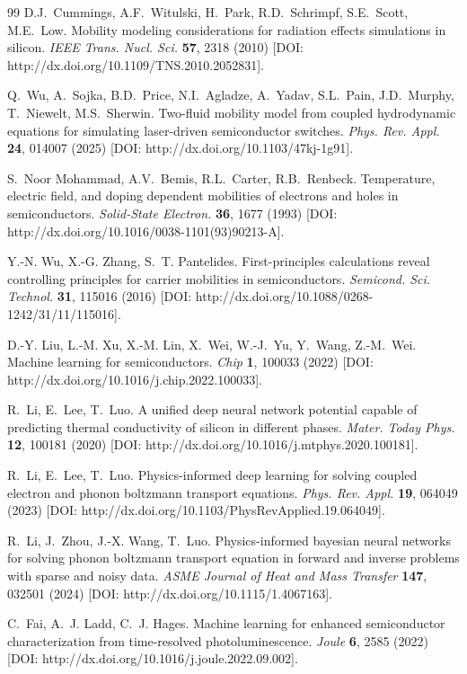 \documentclass[fleqn,twoside,twocolumn,nofootinbib,showkeys]{revtex4} %
\begin{document}
\begin{thebibliography}{99}
D.J.~Cummings, A.F.~Witulski, H.~Park, R.D.~Schrimpf, S.E.~Scott, M.E.~Low. Mobility modeling considerations for radiation effects simulations in silicon. \textit{IEEE Trans. Nucl. Sci.} \textbf{57}, 2318 (2010) [DOI: http://dx.doi.org/10.1109/TNS.2010.2052831].


Q.~Wu, A.~Sojka, B.D.~Price, N.I.~Agladze, A.~Yadav, S.L.~Pain, J.D.~Murphy, T.~Niewelt, M.S.~Sherwin. Two-fluid mobility model from coupled hydrodynamic equations for simulating laser-driven semiconductor switches. \textit{Phys. Rev. Appl.} \textbf{24}, 014007 (2025) [DOI: http://dx.doi.org/10.1103/47kj-1g91].


S.~Noor Mohammad, A.V.~Bemis, R.L.~Carter, R.B.~Renbeck. Temperature, electric field, and doping dependent mobilities of electrons and holes in semiconductors. \textit{Solid-State Electron.} \textbf{36}, 1677 (1993) [DOI: http://dx.doi.org/10.1016/0038-1101(93)90213-A].


Y.-N. Wu, X.-G. Zhang, S.~T. Pantelides. First-principles calculations reveal controlling principles for carrier mobilities in semiconductors. \textit{Semicond. Sci. Technol.} \textbf{31}, 115016 (2016) [DOI: http://dx.doi.org/10.1088/0268-1242/31/11/115016].

D.-Y. Liu, L.-M. Xu, X.-M. Lin, X.~Wei, W.-J.~Yu, Y.~Wang, Z.-M.~Wei. Machine learning for semiconductors. \textit{Chip} \textbf{1}, 100033 (2022) [DOI: http://dx.doi.org/10.1016/j.chip.2022.100033].


R.~Li, E.~Lee, T.~Luo. A unified deep neural network potential capable of predicting thermal conductivity of silicon in different phases. \textit{Mater. Today Phys.} \textbf{12}, 100181 (2020) [DOI: http://dx.doi.org/10.1016/j.mtphys.2020.100181].

R.~Li, E.~Lee, T.~Luo. Physics-informed deep learning for solving coupled electron and phonon boltzmann transport equations. \textit{Phys. Rev. Appl.} \textbf{19}, 064049 (2023) [DOI: http://dx.doi.org/10.1103/PhysRevApplied.19.064049].

R.~Li, J.~Zhou, J.-X. Wang, T.~Luo. Physics-informed bayesian neural networks for solving phonon boltzmann transport equation in forward and inverse problems with sparse and noisy data. \textit{ASME Journal of Heat and Mass Transfer} \textbf{147}, 032501 (2024) [DOI: http://dx.doi.org/10.1115/1.4067163].

C.~Fai, A.~J. Ladd, C.~J. Hages. Machine learning for enhanced semiconductor characterization from time-resolved photoluminescence. \textit{Joule} \textbf{6}, 2585 (2022) [DOI: http://dx.doi.org/10.1016/j.joule.2022.09.002].



\end{thebibliography}
\end{document}
